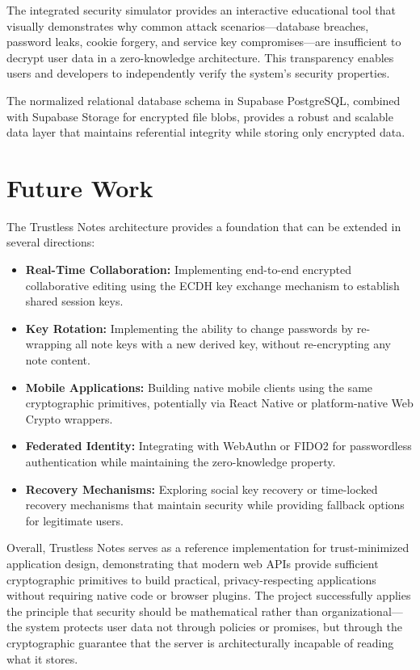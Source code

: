 The integrated security simulator provides an interactive educational tool that visually demonstrates why common attack scenarios---database breaches, password leaks, cookie forgery, and service key compromises---are insufficient to decrypt user data in a zero-knowledge architecture. This transparency enables users and developers to independently verify the system's security properties.

The normalized relational database schema in Supabase PostgreSQL, combined with Supabase Storage for encrypted file blobs, provides a robust and scalable data layer that maintains referential integrity while storing only encrypted data.

\section*{Future Work}

The Trustless Notes architecture provides a foundation that can be extended in several directions:

\begin{itemize}
    \item \textbf{Real-Time Collaboration:} Implementing end-to-end encrypted collaborative editing using the ECDH key exchange mechanism to establish shared session keys.

    \item \textbf{Key Rotation:} Implementing the ability to change passwords by re-wrapping all note keys with a new derived key, without re-encrypting any note content.

    \item \textbf{Mobile Applications:} Building native mobile clients using the same cryptographic primitives, potentially via React Native or platform-native Web Crypto wrappers.

    \item \textbf{Federated Identity:} Integrating with WebAuthn or FIDO2 for passwordless authentication while maintaining the zero-knowledge property.

    \item \textbf{Recovery Mechanisms:} Exploring social key recovery or time-locked recovery mechanisms that maintain security while providing fallback options for legitimate users.
\end{itemize}

Overall, Trustless Notes serves as a reference implementation for trust-minimized application design, demonstrating that modern web APIs provide sufficient cryptographic primitives to build practical, privacy-respecting applications without requiring native code or browser plugins. The project successfully applies the principle that security should be mathematical rather than organizational---the system protects user data not through policies or promises, but through the cryptographic guarantee that the server is architecturally incapable of reading what it stores.
